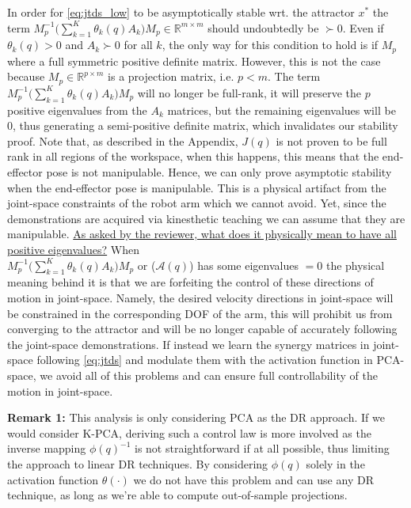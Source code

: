 \documentclass{article}
\begin{document}
\begin{enumerate}
In order for \eqref{eq:jtds_low} to be asymptotically stable wrt. the attractor $x^*$ the term $M_p^{-1}\big(\sum_{k=1}^{K}\theta_k(q)A_k\big)M_p \in \mathbb{R}^{m\times m}$ should undoubtedly be $\succ 0$. Even if $\theta_k(q) > 0$ and $A_k \succ 0$ for all $k$, the only way for this condition to hold is if $M_p$ where a full symmetric positive definite matrix. However, this is not the case because $M_p\in \mathbb{R}^{p\times m}$  is a projection matrix, i.e. $p<m$. The term $M_p^{-1}\big(\sum_{k=1}^{K}\theta_k(q)A_k\big)M_p$ will no longer be full-rank, it will preserve the $p$ positive eigenvalues from the $A_k$ matrices, but the remaining eigenvalues will be 0, thus generating a semi-positive definite matrix, which invalidates our stability proof. Note that, as described in the Appendix, $J(q)$ is not proven to be full rank in all regions of the workspace, when this happens, this means that the end-effector pose is not manipulable. Hence, we can only prove asymptotic stability when the end-effector pose is manipulable. This is a physical artifact from the joint-space constraints of the robot arm which we cannot avoid. Yet, since the demonstrations are acquired via kinesthetic teaching we can assume that they are manipulable. \underline{As asked by the reviewer, what does it physically mean to have all positive eigenvalues?}  When \\ $M_p^{-1}\big(\sum_{k=1}^{K}\theta_k(q)A_k\big)M_p$  or ($\mathcal{A}(q)$) has some eigenvalues $=0$ the physical meaning behind it is that we are forfeiting the control of these directions of motion in joint-space. Namely, the desired velocity directions in joint-space will be constrained in the corresponding DOF of the arm, this will prohibit us from converging to the attractor and will be no longer capable of accurately following the joint-space demonstrations.  If instead we learn the synergy matrices in joint-space following \eqref{eq:jtds} and modulate them with the activation function in PCA-space, we avoid all of this problems and can ensure full controllability of the motion in joint-space. 

\noindent \textbf{Remark 1:} This analysis is only considering PCA as the DR approach. If we would consider K-PCA, deriving such a control law is more involved as the inverse mapping $\phi(q)^{-1}$ is not straightforward if at all possible, thus limiting the approach to linear DR techniques. By considering $\phi(q)$ solely in the activation function $\theta(\cdot)$ we do not have this problem and can use any DR technique, as long as we're able to compute out-of-sample projections.


\end{enumerate}
\end{document}
